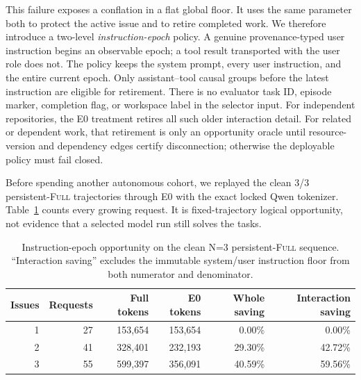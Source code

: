 \documentclass[11pt]{article}
\begin{document}
This failure exposes a conflation in a flat global floor.  It uses the same
parameter both to protect the active issue and to retire completed work.  We
therefore introduce a two-level \emph{instruction-epoch} policy.  A genuine
provenance-typed user instruction begins an observable epoch; a tool result
transported with the user role does not.  The policy keeps the system prompt,
every user instruction, and the entire current epoch.  Only assistant--tool
causal groups before the latest instruction are eligible for retirement.
There is no evaluator task ID, episode marker, completion flag, or workspace
label in the selector input.  For independent repositories, the E0 treatment
retires all such older interaction detail.  For related or dependent work,
that retirement is only an opportunity oracle until resource-version and
dependency edges certify disconnection; otherwise the deployable policy must
fail closed.

Before spending another autonomous cohort, we replayed the clean 3/3
persistent-\textsc{Full} trajectories through E0 with the exact locked Qwen
tokenizer.  Table~\ref{tab:instruction-epoch-oracle} counts every growing
request.  It is fixed-trajectory logical opportunity, not evidence that a
selected model run still solves the tasks.

\begin{table}[H]
\centering
\small
\caption{Instruction-epoch opportunity on the clean N=3 persistent-\textsc{Full}
sequence. ``Interaction saving'' excludes the immutable system/user
instruction floor from both numerator and denominator.}
\label{tab:instruction-epoch-oracle}
\begin{tabular}{rrrrrr}
\toprule
Issues & Requests & Full tokens & E0 tokens & Whole saving & Interaction saving \\
\midrule
1 & 27 & 153,654 & 153,654 & 0.00\% & 0.00\% \\
2 & 41 & 328,401 & 232,193 & 29.30\% & 42.72\% \\
3 & 55 & 599,397 & 356,091 & 40.59\% & 59.56\% \\
\bottomrule
\end{tabular}
\end{table}
\end{document}
